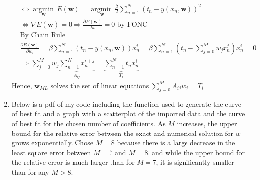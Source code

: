 \documentclass[10pt]{article}
\DeclareMathOperator*{\argmin}{argmin\,}
\begin{document}
\begin{enumerate}
\begin{align*}
        &\Leftrightarrow \underset{\mathbf{w}}{\argmin} E(\mathbf{w})=\underset{\mathbf{w}}{\argmin}\frac{\beta}{2}\sum_{n=1}^{N}{(t_n-y(x_n,\mathbf{w}))}^2\\
        &\Leftrightarrow \nabla E(\mathbf{w})=0\Rightarrow \frac{\partial E(\mathbf{w})}{\partial i}=0\text{ by FONC}\\
        &\text{By Chain Rule}\\
        &\frac{\partial E(\mathbf{w})}{\partial w_i}=\beta\sum_{n=1}^{N}{(t_n-y(x_n,\mathbf{w}))}x_n^i=\beta\sum_{n=1}^{N}{(t_n-\sum_{j=0}^{M}w_j x_n^j)}x_n^i=0\\
        &\Rightarrow \sum_{j=0}^{M}w_j\underbrace{\sum_{n=1}^{N} x_n^{i+j}}_{A_{ij}}=\underbrace{\sum_{n=1}^{N}t_n x_n^i}_{T_i}
    \end{align*}
    Hence, $\mathbf{w}_{ML}$ solves the set of linear equations $\displaystyle\sum_{j=0}^{M}A_{ij}w_j=T_i$
    \item Below is a pdf of my code including the function used to generate the curve of best fit and a graph with a scatterplot of the imported data and the curve of best fit for the chosen number of coefficients. 
    As $M$ increases, the upper bound for the relative error between the exact and numerical solution for $w$ grows exponentially. 
    Chose $M=8$ because there is a large decrease in the least square error between $M=7$ and $M=8$, and while the upper bound for the relative error is much larger than for $M=7$, it is significantly smaller than for any $M>8$.
    
\end{enumerate}
\end{document}
